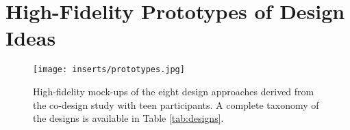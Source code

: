 \section{High-Fidelity Prototypes of Design Ideas}
\label{fig:prototypes}

\begin{figure*}[!h]
    \centering
    \texttt{[image: inserts/prototypes.jpg]}
    \caption{High-fidelity mock-ups of the eight design approaches derived from the co-design study with teen participants. A complete taxonomy of the designs is available in Table \ref{tab:designs}.} 
\end{figure*}
